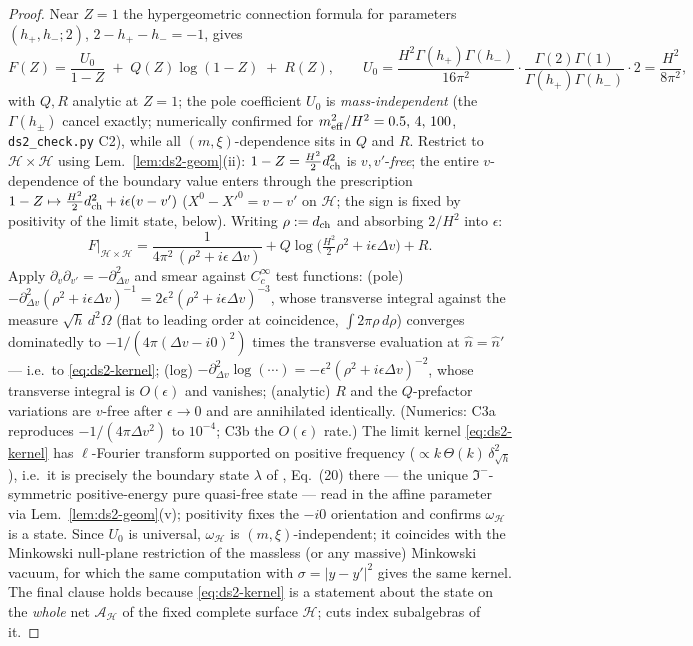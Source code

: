 \begin{proof}
Near $Z=1$ the hypergeometric connection formula for parameters
$(h_+,h_-;2)$, $2-h_+-h_-=-1$, gives
\[
F(Z)=\frac{U_0}{1-Z}\;+\;Q(Z)\log(1-Z)\;+\;R(Z),
\qquad
U_0=\frac{H^{2}\Gamma(h_+)\Gamma(h_-)}{16\pi^{2}}\cdot
\frac{\Gamma(2)\Gamma(1)}{\Gamma(h_+)\Gamma(h_-)}\cdot 2
=\frac{H^{2}}{8\pi^{2}},
\]
with $Q,R$ analytic at $Z=1$; the pole coefficient $U_0$ is
\emph{mass-independent} (the $\Gamma(h_\pm)$ cancel exactly;
numerically confirmed for $m_{\rm eff}^2/H^2=0.5,\,4,\,100$,
\texttt{ds2\_check.py} C2), while all $(m,\xi)$-dependence sits in
$Q$ and $R$. Restrict to $\mathcal H\times\mathcal H$ using
Lem.~\ref{lem:ds2-geom}(ii): $1-Z=\tfrac{H^2}{2}d_{\rm ch}^2$ is
$v,v'$-\emph{free}; the entire $v$-dependence of the boundary value
enters through the prescription
$1-Z\mapsto\tfrac{H^2}{2}d_{\rm ch}^2+i\epsilon(v-v')$
($X^0-X'^0=v-v'$ on $\mathcal H$; the sign is fixed by positivity of
the limit state, below). Writing $\rho:=d_{\rm ch}$ and absorbing
$2/H^{2}$ into $\epsilon$:
\[
F\big|_{\mathcal H\times\mathcal H}
=\frac{1}{4\pi^{2}\,(\rho^{2}+i\epsilon\,\Delta v)}
+Q\log\bigl(\tfrac{H^2}{2}\rho^{2}+i\epsilon\Delta v\bigr)+R .
\]
Apply $\partial_v\partial_{v'}=-\partial^2_{\Delta v}$ and smear
against $C^\infty_c$ test functions: (pole) $-\partial^2_{\Delta
v}(\rho^2+i\epsilon\Delta v)^{-1}=2\epsilon^{2}(\rho^{2}
+i\epsilon\Delta v)^{-3}$, whose transverse integral against the
measure $\sqrt h\,d^2\Omega$ (flat to leading order at coincidence,
$\int 2\pi\rho\,d\rho$) converges dominatedly to
$-1/(4\pi(\Delta v-i0)^{2})$ times the transverse evaluation at
$\hat n=\hat n'$ --- i.e.\ to \eqref{eq:ds2-kernel}; (log)
$-\partial^2_{\Delta v}\log(\cdots)=-\epsilon^{2}(\rho^{2}
+i\epsilon\Delta v)^{-2}$, whose transverse integral is
$O(\epsilon)$ and vanishes; (analytic) $R$ and the $Q$-prefactor
variations are $v$-free after $\epsilon\to0$ and are annihilated
identically. (Numerics: C3a reproduces $-1/(4\pi\Delta v^{2})$ to
$10^{-4}$; C3b the $O(\epsilon)$ rate.) The limit kernel
\eqref{eq:ds2-kernel} has $\ell$-Fourier transform supported on
positive frequency ($\propto k\,\Theta(k)\,
\delta^2_{\sqrt h}$), i.e.\ it is precisely the boundary state
$\lambda$ of \cite{DappiaggiMorettiPinamonti2009}, Eq.~(20) there
--- the unique $\Im^-$-symmetric positive-energy pure quasi-free
state --- read in the affine parameter via
Lem.~\ref{lem:ds2-geom}(v); positivity fixes the $-i0$ orientation
and confirms $\omega_{\mathcal H}$ is a state. Since $U_0$ is
universal, $\omega_{\mathcal H}$ is $(m,\xi)$-independent; it
coincides with the Minkowski null-plane restriction of the massless
(or any massive) Minkowski vacuum, for which the same computation
with $\sigma=|y-y'|^2$ gives the same kernel. The final clause holds
because \eqref{eq:ds2-kernel} is a statement about the state on the
\emph{whole} net $\mathcal A_{\mathcal H}$ of the fixed complete
surface $\mathcal H$; cuts index subalgebras of it.
\end{proof}

